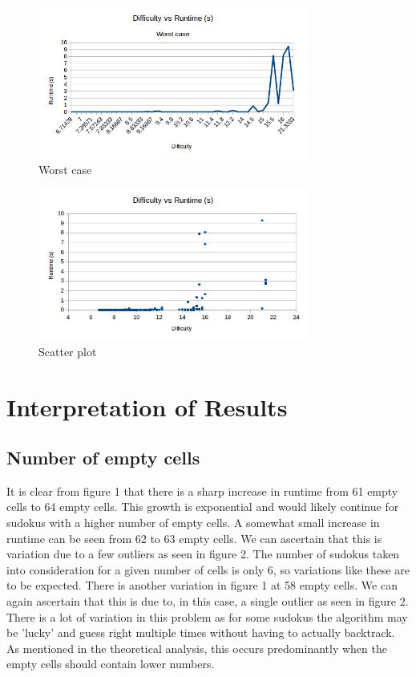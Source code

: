 \documentclass{article}
\begin{document}
\begin{figure}[H]
	\includegraphics[width=0.9\linewidth, height=5cm]{graphs_outputs/DifficultyVSTimeWorst.jpg}
	\caption{Worst case}
\end{figure}

\begin{figure}[H]
	\includegraphics[width=0.9\linewidth, height=5cm]{graphs_outputs/DifficultyVSTimeScatter.jpg}
	\caption{Scatter plot}
\end{figure}

\newpage

\section{Interpretation of Results}
\subsection{Number of empty cells}
It is clear from figure 1 that there is a sharp increase in runtime from 61 empty cells to 64 empty cells. This growth is exponential and would likely continue for sudokus with a higher number of empty cells. A somewhat small increase in runtime can be seen from 62 to 63 empty cells. We can ascertain that this is variation due to a few outliers as seen in figure 2. The number of sudokus taken into consideration for a given number of cells is only 6, so variations like these are to be expected. There is another variation in figure 1 at 58 empty cells. We can again ascertain that this is due to, in this case, a single outlier as seen in figure 2. There is a lot of variation in this problem as for some sudokus the algorithm may be 'lucky' and guess right multiple times without having to actually backtrack. As mentioned in the theoretical analysis, this occurs predominantly when the empty cells should contain lower numbers.
\end{document}
